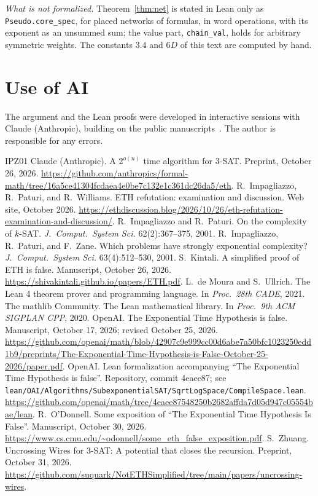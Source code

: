 \documentclass[11pt]{article}
\newcommand{\lean}[1]{\texttt{#1}}
\begin{document}
\emph{What is not formalized.} Theorem~\ref{thm:net} is stated in Lean only as \lean{Pseudo.core\_spec}, for placed networks of formulas, in word operations, with its exponent as an unsummed sum; the value part, \lean{chain\_val}, holds for arbitrary symmetric weights. The constants $3.4$ and $6D$ of this text are computed by hand.

\section*{Use of AI}
The argument and the Lean proofs were developed in interactive sessions with Claude (Anthropic), building on the public manuscripts~\cite{OAI26,OD26,Cla26,Kin26}. The author is responsible for any errors.

\begin{thebibliography}{IPZ01}
 Claude (Anthropic). A $2^{o(n)}$ time algorithm for 3-SAT. Preprint, October 26, 2026. \url{https://github.com/anthropics/formal-math/tree/16a5ce41304fcdaea4e0be7c132e1c361dc26da5/eth}.
 R.~Impagliazzo, R.~Paturi, and R.~Williams. ETH refutation: examination and discussion. Web site, October 2026. \url{https://ethdiscussion.blog/2026/10/26/eth-refutation-examination-and-discussion/}.
 R.~Impagliazzo and R.~Paturi. On the complexity of $k$-SAT. \emph{J.\ Comput.\ System Sci.} 62(2):367--375, 2001.
 R.~Impagliazzo, R.~Paturi, and F.~Zane. Which problems have strongly exponential complexity? \emph{J.\ Comput.\ System Sci.} 63(4):512--530, 2001.
 S.~Kintali. A simplified proof of ETH is false. Manuscript, October 26, 2026. \url{https://shivakintali.github.io/papers/ETH.pdf}.
 L.~de Moura and S.~Ullrich. The Lean 4 theorem prover and programming language. In \emph{Proc.\ 28th CADE}, 2021.
 The mathlib Community. The Lean mathematical library. In \emph{Proc.\ 9th ACM SIGPLAN CPP}, 2020.
 OpenAI. The Exponential Time Hypothesis is false. Manuscript, October 17, 2026; revised October 25, 2026. \url{https://github.com/openai/math/blob/42907c9e999cc00d6abe7a50bfc1023250edd1b9/preprints/The-Exponential-Time-Hypothesis-is-False-October-25-2026/paper.pdf}.
 OpenAI. Lean formalization accompanying ``The Exponential Time Hypothesis is false''. Repository, commit 4eaee87; see \texttt{lean/OAI/Algorithms/SubexponentialSAT/SqrtLogSpace/CompileSpace.lean}. \url{https://github.com/openai/math/tree/4eaee87548250b2682affda7d05d947c05554bae/lean}.
 R.~O'Donnell. Some exposition of ``The Exponential Time Hypothesis Is False''. Manuscript, October 30, 2026. \url{https://www.cs.cmu.edu/~odonnell/some_eth_false_exposition.pdf}.
 S.~Zhuang. Uncrossing Wires for 3-SAT: A potential that closes the recursion. Preprint, October 31, 2026. \url{https://github.com/suquark/NotETHSimplified/tree/main/papers/uncrossing-wires}.
\end{thebibliography}
\end{document}

